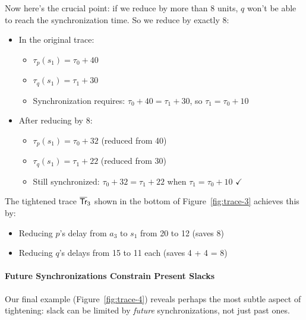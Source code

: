 Now here's the crucial point: if we reduce by more than 8 units, $q$ won't be able to reach the synchronization time. So we reduce by exactly 8:

\begin{itemize}
\item In the original trace:
  \begin{itemize}
  \item $\tau_p(s_1) = \tau_0 + 40$
  \item $\tau_q(s_1) = \tau_1 + 30$
  \item Synchronization requires: $\tau_0 + 40 = \tau_1 + 30$, so $\tau_1 = \tau_0 + 10$
  \end{itemize}

\item After reducing by 8:
  \begin{itemize}
  \item $\tau_p(s_1) = \tau_0 + 32$ (reduced from 40)
  \item $\tau_q(s_1) = \tau_1 + 22$ (reduced from 30)
  \item Still synchronized: $\tau_0 + 32 = \tau_1 + 22$ when $\tau_1 = \tau_0 + 10$ $\checkmark$
  \end{itemize}
\end{itemize}

The tightened trace $\overline{\textsf{Tr}}_3$ shown in the bottom of Figure~\ref{fig:trace-3} achieves this by:
\begin{itemize}
\item Reducing $p$'s delay from $a_3$ to $s_1$ from 20 to 12 (saves 8)
\item Reducing $q$'s delays from 15 to 11 each (saves 4 + 4 = 8)
\end{itemize}

\paragraph*{Future Synchronizations Constrain Present Slacks}

Our final example (Figure~\ref{fig:trace-4}) reveals perhaps the most subtle aspect of tightening: slack can be limited by \emph{future} synchronizations, not just past ones.

